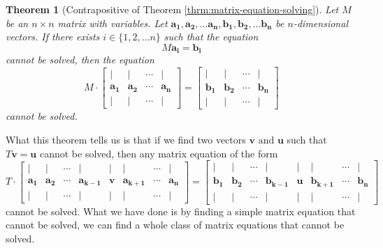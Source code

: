 \documentclass[a4paper,10pt]{article}
\theoremstyle{plain}
\newtheorem{Theorem}{Theorem}
\theoremstyle{definition}
\theoremstyle{remark}
\renewcommand{\vec}[1]{\mathbf{#1}}
\begin{document}
\begin{Theorem}[Contrapositive of Theorem \ref{thrm:matrix-equation-solving}]
	Let \( M \) be an \( n \times n \) matrix with variables.
	Let \( \vec{a_1}, \vec{a_2}, \dots \vec{a_n}, \vec{b_1}, \vec{b_2}, \dots \vec{b_n} \) be \( n \)-dimensional vectors.
	If there exists \( i \in \{1, 2, \dots n\} \) such that the equation \[M\vec{a_i} = \vec{b_i}\] cannot be solved,
	then the equation \[
	M
	\cdot
	\begin{bmatrix}
		| & | & \cdots & |\\
		\vec{a_1} & \vec{a_2} & \cdots & \vec{a_n} \\
		| & | & \cdots & |
	\end{bmatrix}
	=
	\begin{bmatrix}
		| & | & \cdots & |\\
		\vec{b_1} & \vec{b_2} & \cdots & \vec{b_n} \\
		| & | & \cdots & |
	\end{bmatrix}
	\]
	cannot be solved.
\end{Theorem}
What this theorem tells us is that if we find two vectors \( \vec{v} \text{ and } \vec{u} \) such that \( T\vec{v} = \vec{u} \) cannot be solved,
then any matrix equation of the form \[
	T
	\cdot
	\begin{bmatrix}
		| & | & \cdots & | & | & | & \cdots & |\\
		\vec{a_1} & \vec{a_2} & \cdots & \vec{a_{k-1}} & \vec{v} & \vec{a_{k+1}} & \cdots & \vec{a_n} \\
		| & | & \cdots & | & | & | & \cdots & |
	\end{bmatrix}
	=
	\begin{bmatrix}
		| & | & \cdots & | & | & | & \cdots & |\\
		\vec{b_1} & \vec{b_2} & \cdots & \vec{b_{k-1}} & \vec{u} & \vec{b_{k+1}} & \cdots & \vec{b_n} \\
		| & | & \cdots & | & | & | & \cdots & |
	\end{bmatrix}
\]
cannot be solved.
What we have done is by finding a simple matrix equation that cannot be solved, we can find a whole class of matrix equations that cannot be solved.

\end{document}

